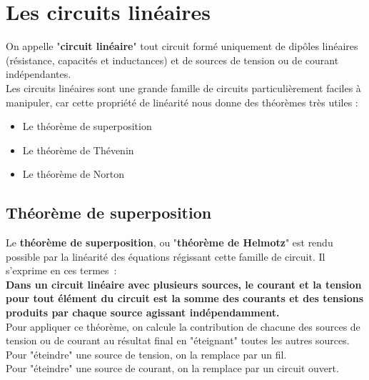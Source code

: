 \chapter{Les circuits linéaires}

On appelle "\textbf{circuit linéaire}" tout circuit formé uniquement de dipôles linéaires (résistance, capacités et inductances) et de sources de tension ou de courant indépendantes. \\

Les circuits linéaires sont une grande famille de circuits particulièrement faciles à manipuler, car cette propriété de linéarité nous donne des théorèmes très utiles :\\

\begin{itemize}
\item Le théorème de superposition
\item Le théorème de Thévenin
\item Le théorème de Norton
\end{itemize}


\section{Théorème de superposition}

Le \textbf{théorème de superposition}, ou "\textbf{théorème de Helmotz}" est rendu possible par la linéarité des équations régissant cette famille de circuit. Il s'exprime en ces termes~:\\

\textbf{Dans un circuit linéaire avec plusieurs sources, le courant et la tension pour tout élément du circuit est la somme des courants et des tensions produits par chaque source agissant indépendamment.} \\

Pour appliquer ce théorème, on calcule la contribution de chacune des sources de tension ou de courant au résultat final en "éteignant" toutes les autres sources.\\

Pour "éteindre" une source de tension, on la remplace par un fil. \\

Pour "éteindre" une source de courant, on la remplace par un circuit ouvert. \\

